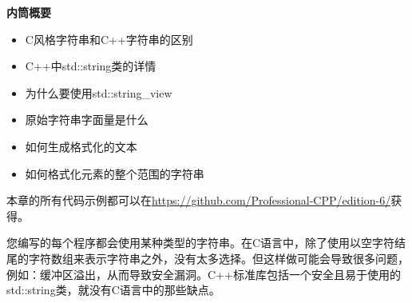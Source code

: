 \noindent
\textbf{内筒概要}

\begin{itemize}
\item
C风格字符串和C++字符串的区别

\item
C++中std::string类的详情

\item
为什么要使用std::string\_view

\item
原始字符串字面量是什么

\item
如何生成格式化的文本

\item
如何格式化元素的整个范围的字符串
\end{itemize}


本章的所有代码示例都可以在\url{https://github.com/Professional-CPP/edition-6/}获得。

您编写的每个程序都会使用某种类型的字符串。在C语言中，除了使用以空字符结尾的字符数组来表示字符串之外，没有太多选择。但这样做可能会导致很多问题，例如：缓冲区溢出，从而导致安全漏洞。C++标准库包括一个安全且易于使用的std::string类，就没有C语言中的那些缺点。














